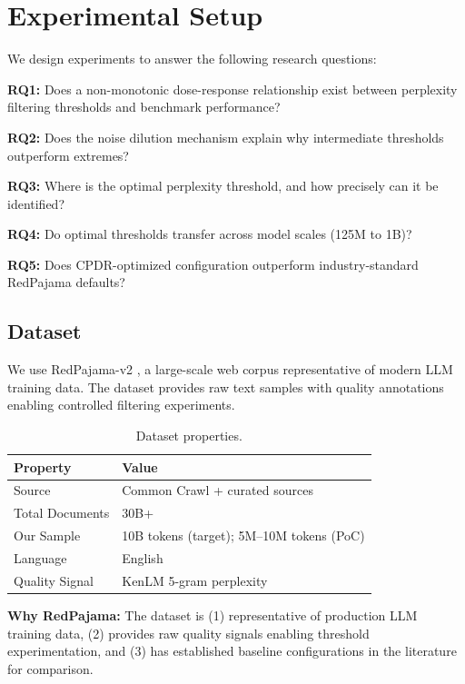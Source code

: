 \section{Experimental Setup}
\label{sec:experimental}

We design experiments to answer the following research questions:

\textbf{RQ1:} Does a non-monotonic dose-response relationship exist between perplexity filtering thresholds and benchmark performance?

\textbf{RQ2:} Does the noise dilution mechanism explain why intermediate thresholds outperform extremes?

\textbf{RQ3:} Where is the optimal perplexity threshold, and how precisely can it be identified?

\textbf{RQ4:} Do optimal thresholds transfer across model scales (125M to 1B)?

\textbf{RQ5:} Does CPDR-optimized configuration outperform industry-standard RedPajama defaults?

\subsection{Dataset}

We use RedPajama-v2 \citep{together2023redpajama}, a large-scale web corpus representative of modern LLM training data. The dataset provides raw text samples with quality annotations enabling controlled filtering experiments.

\begin{table}[h]
\centering
\caption{Dataset properties.}
\label{tab:dataset}
\begin{tabular}{@{}ll@{}}
\toprule
Property & Value \\
\midrule
Source & Common Crawl + curated sources \\
Total Documents & 30B+ \\
Our Sample & 10B tokens (target); 5M--10M tokens (PoC) \\
Language & English \\
Quality Signal & KenLM 5-gram perplexity \\
\bottomrule
\end{tabular}
\end{table}

\textbf{Why RedPajama:} The dataset is (1) representative of production LLM training data, (2) provides raw quality signals enabling threshold experimentation, and (3) has established baseline configurations in the literature for comparison.

